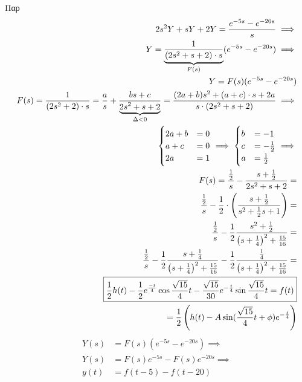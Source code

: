 \documentclass[11pt,a4paper,titlepage,final]{article}
\begin{document}
\begin{exercise*}{Παρ}
\begin{align*}
2s^2Y+sY+2Y = \frac{e^{-5s}-e^{-20s}}{s} \implies \\
Y = \underbrace{\frac{1}{(2s^2+s+2)\cdot s}}_{\mathclap{F(s)}}(e^{-5s}-e^{-20s}) \implies \\
Y = F(s) (e^{-5s}-e^{-20s}) \\
F(s) = \frac{1}{(2s^2+2)\cdot s} = \frac{a}{s}+\frac{bs+c}{\underbrace{2s^2+s+2}_{\mathclap{\Delta < 0}}} = \frac{(2a+b)s^2+(a+c)\cdot s+2a}{s \cdot (2s^2+s+2)} \implies \\
\begin{cases}
2a+b &= 0
\\ a+c &= 0
\\ 2a &= 1
\end{cases} \implies \begin{cases}
b &= -1 \\
c &= -\frac{1}{2} \\
a &= \frac{1}{2}
\end{cases} \implies \\
F(s) = \frac{\frac{1}{2}}{s} - \frac{s+\frac{1}{2}}{2s^2+s+2} = \\
\frac{\frac{1}{2}}{s}-\frac{1}{2}\cdot \left(
\frac{s+\frac{1}{2}}{s^2+\frac{1}{2}s+1}
\right) = \\
\frac{\frac{1}{2}}{s}-\frac{1}{2}\frac{s^2+\frac{1}{2}}{\left(s+\frac{1}{4} \right)^2+\frac{15}{16}} = \\
\frac{\frac{1}{2}}{s}-\frac{1}{2}\frac{s+\frac{1}{4}}{\left(s+\frac{1}{4} \right)^2+\frac{15}{16}} - \frac{1}{2}\frac{\frac{1}{4}}{\left(s+\frac{1}{4} \right)^2+\frac{15}{16}} = \\
\boxed{
	\frac{1}{2}h(t) - \frac{1}{2}e^\frac{-t}{4}\cos\frac{\sqrt{15}}{4}t - \frac{\sqrt{15}}{30}e^{-\frac{t}{4}}\sin\frac{\sqrt{15}}{4}t=f(t)
	} \\
	= \frac{1}{2} \left(
	h(t) - A\sin(\frac{\sqrt{15}}{4}t+\phi)e^{-\frac{t}{4}}
	\right)
\end{align*}
\begin{align*}
Y(s) &= F(s)(e^{-5s}-e^{-20s}) \implies \\
Y(s) &= F(s)e^{-5s}-F(s)e^{-20s} \implies \\
y(t) &= f(t-5) - f(t-20)
\end{align*}
\end{exercise*}
\end{document}
